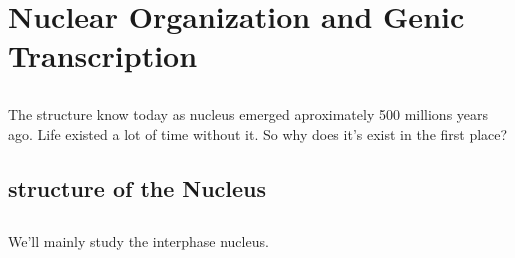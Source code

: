 \setchapterpreamble[u]{\margintoc}
\chapter{Nuclear Organization and Genic Transcription}

\section{}
	The structure know today as nucleus emerged aproximately 500 millions years ago.
	Life existed a lot of time without it. So why does it's exist in the first place?

\section{structure of the Nucleus}

\section{}
	We'll mainly study the interphase nucleus.
	

